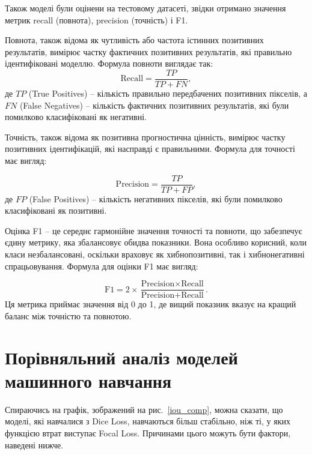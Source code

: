 Також моделі були оцінени на тестовому датасеті, звідки отримано
значення метрик recall (повнота), precision (точність) і F1.

Повнота, також відома як чутливість або частота
істинних позитивних результатів, вимірює частку фактичних
позитивних результатів, які правильно ідентифіковані моделлю.
Формула повноти виглядає так:
\begin{equation*}
      \text{Recall} = \frac{TP}{TP + FN},
\end{equation*}
де $TP$ (True Positives) -- кількість
правильно передбачених позитивних пікселів,
а $FN$ (False Negatives) -- кількість фактичних
позитивних результатів, які були помилково
класифіковані як негативні.

Точність, також відома як позитивна прогностична цінність,
вимірює частку позитивних ідентифікацій, які
насправді є правильними.
Формула для точності має вигляд:

\begin{equation*}
      \text{Precision} = \frac{TP}{TP + FP},
\end{equation*}
де $FP$ (False Positives) -- кількість негативних пікселів,
які були помилково класифіковані як позитивні.

Оцінка F1 -- це середнє гармонійне значення точності та
повноти, що забезпечує єдину метрику,
яка збалансовує обидва показники. Вона
особливо корисний, коли класи незбалансовані,
оскільки враховує як хибнопозитивні, так і
хибнонегативні спрацьовування. Формула для
оцінки F1 має вигляд:

\begin{equation*}
      \text{F1} = 2 \times \frac{\text{Precision} \times \text{Recall}}{\text{Precision} + \text{Recall}}.
\end{equation*}
Ця метрика приймає значення від 0 до 1, де
вищий показник вказує на кращий баланс між
точністю та повнотою.

\section{Порівняльний аналіз моделей машинного навчання}

Спираючись на графік, зображений на рис.~\ref{iou_comp},
можна сказати, що моделі, які навчалися з Dice Loss,
навчаються більш стабільно, ніж ті, у яких функцією
втрат виступає Focal Loss.
Причинами цього можуть бути фактори, наведені нижче.

